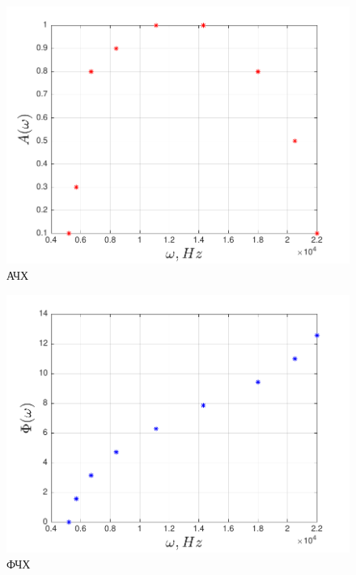 \begin{figure}[H]
	\centering
	\includegraphics[scale=0.9]{graph/graph5}
	\caption{АЧХ}
	\label{fig:figure5}
\end{figure}

\begin{figure}[H]
	\centering
	\includegraphics[scale=0.9]{graph/graph6}
	\caption{ФЧХ}
	\label{fig:figure6}
\end{figure}





